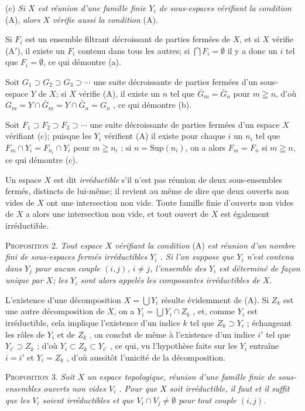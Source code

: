 (c) \textit{Si $X$ est réunion d'une famille finie $Y_i$ de sous-espaces vérifiant la condition} (A), \textit{alors $X$ vérifie aussi la condition} (A).

Si $F_i$ est un ensemble filtrant décroissant de parties fermées de $X$, et si $X$ vérifie (A$'$), il existe un $F_i$ contenu dans tous les autres; si $\bigcap F_i = \emptyset$ il y a donc un $i$ tel que $F_i = \emptyset$, ce qui démontre (a).

Soit $G_1 \supset G_2 \supset G_3 \supset \cdots$ une suite décroissante de parties fermées d'un sous-espace $Y$ de $X$; si $X$ vérifie (A), il existe un $n$ tel que $\bar{G}_m = \bar{G}_n$ pour $m \geqq n$, d'où $G_m = Y \cap \bar{G}_m = Y \cap \bar{G}_n = G_n$ , ce qui démontre (b).

Soit $F_1 \supset F_2 \supset F_3 \supset \cdots$ une suite décroissante de parties fermées d'un espace $X$ vérifiant (c); puisque les $Y_i$ vérifient (A) il existe pour chaque $i$ un $n_i$ tel que $F_m \cap Y_i = F_{n_i} \cap Y_i$ pour $m \geqq n_i$ ; si $n = \mathrm{Sup}(n_i)$, on a alors $F_m = F_n$ si $m \geqq n$, ce qui démontre (c).

Un espace $X$ est dit \textit{irréductible} s'il n'est pas réunion de deux sous-ensembles fermés, distincts de lui-même; il revient au même de dire que deux ouverts non vides de $X$ ont une intersection non vide. Toute famille finie d'ouverts non vides de $X$ a alors une intersection non vide, et tout ouvert de $X$ est également irréductible.

\textsc{Proposition} 2. \textit{Tout espace $X$ vérifiant la condition} (A) \textit{est réunion d'un nombre fini de sous-espaces fermés irréductibles $Y_i$ . Si l'on suppose que $Y_i$ n'est contenu dans $Y_j$ pour aucun couple $(i, j)$, $i \neq j$, l'ensemble des $Y_i$ est déterminé de façon unique par $X$; les $Y_i$ sont alors appelés les composantes irréductibles de $X$.}

L'existence d'une décomposition $X = \bigcup Y_i$ résulte évidemment de (A). Si $Z_k$ est une autre décomposition de $X$, on a $Y_i = \bigcup Y_i \cap Z_k$ , et, comme $Y_i$ est irréductible, cela implique l'existence d'un indice $k$ tel que $Z_k \supset Y_i$ ; échangeant les rôles de $Y_i$ et de $Z_k$ , on conclut de même à l'existence d'un indice $i'$ tel que $Y_{i'} \supset Z_k$ ; d'où $Y_i \subset Z_k \subset Y_{i'}$ , ce qui, vu l'hypothèse faite sur les $Y_i$ entraîne $i = i'$ et $Y_i = Z_k$ , d'où aussitôt l'unicité de la décomposition.

\textsc{Proposition} 3. \textit{Soit $X$ un espace topologique, réunion d'une famille finie de sous-ensembles ouverts non vides $V_i$ . Pour que $X$ soit irréductible, il faut et il suffit que les $V_i$ soient irréductibles et que $V_i \cap V_j \neq \emptyset$ pour tout couple $(i, j)$.}


